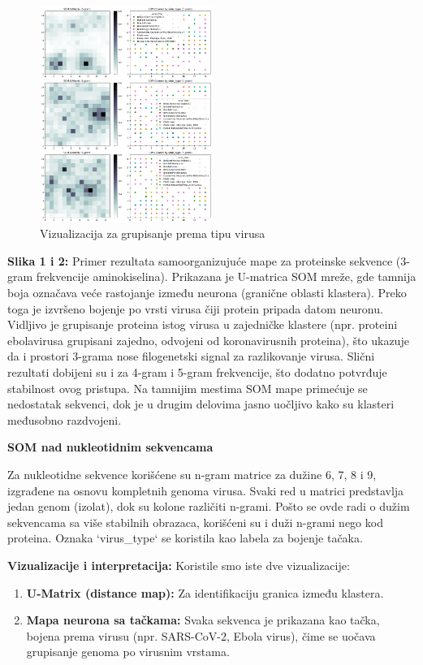 \documentclass[a4paper,12pt]{article}
\begin{document}
\begin{figure}[h!]
    \centering
    \includegraphics[width=0.5\textwidth]{images/som-amino-acid-virus.png}
    \caption{Vizualizacija za grupisanje prema tipu virusa}
    \label{fig:som-struktura2}
\end{figure}

\textbf{Slika 1 i 2:} Primer rezultata samoorganizujuće mape za proteinske sekvence (3-gram frekvencije
aminokiselina). Prikazana je U-matrica SOM mreže, gde tamnija boja označava veće rastojanje između
neurona (granične oblasti klastera). Preko toga je izvršeno bojenje po vrsti virusa čiji protein pripada
datom neuronu. Vidljivo je grupisanje proteina istog virusa u zajedničke klastere (npr. proteini ebolavirusa
grupisani zajedno, odvojeni od koronavirusnih proteina), što ukazuje da i prostori 3-grama nose filogenetski
signal za razlikovanje virusa. Slični rezultati dobijeni su i za 4-gram i 5-gram frekvencije, što dodatno potvrđuje stabilnost ovog pristupa. Na tamnijim mestima SOM mape primećuje se nedostatak sekvenci, dok je u drugim delovima jasno uočljivo kako su klasteri međusobno razdvojeni.

\vspace{20pt}
\textbf{SOM nad nukleotidnim sekvencama}
\vspace{10pt}

Za nukleotidne sekvence korišćene su n-gram matrice za dužine 6, 7, 8 i 9, izgrađene na osnovu kompletnih genoma virusa. Svaki red u matrici predstavlja jedan genom (izolat), dok su kolone različiti n-grami. Pošto se ovde radi o dužim sekvencama sa više stabilnih obrazaca, korišćeni su i duži n-grami nego kod proteina. Oznaka `virus\_type` se koristila kao labela za bojenje tačaka.

\vspace{10pt}
\textbf{Vizualizacije i interpretacija:}
Koristile smo iste dve vizualizacije:
\begin{enumerate}
  \item \textbf{U-Matrix (distance map):} Za identifikaciju granica između klastera.
  \item \textbf{Mapa neurona sa tačkama:} Svaka sekvenca je prikazana kao tačka, bojena prema virusu (npr. SARS-CoV-2, Ebola virus), čime se uočava grupisanje genoma po virusnim vrstama.
\end{enumerate}
\end{document}

